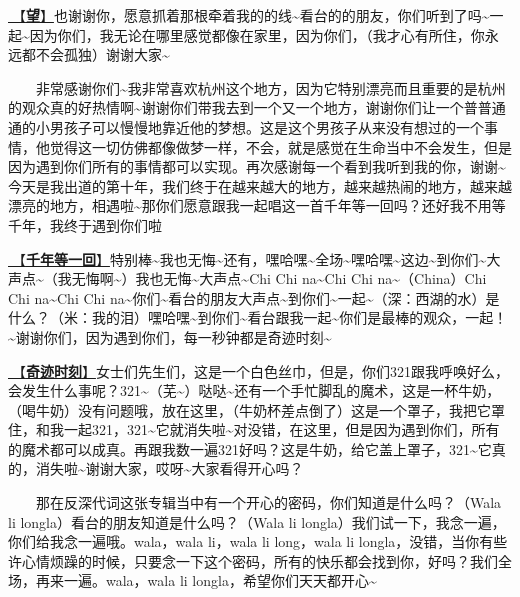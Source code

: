 \documentclass[]{ctexbook}
\begin{document}
\hyperref[Gaze]{🎵【\textbf{望}】}也谢谢你，愿意抓着那根牵着我的的线\textasciitilde 看台的的朋友，你们听到了吗\textasciitilde 一起\textasciitilde 因为你们，我无论在哪里感觉都像在家里，因为你们，（我才心有所住，你永远都不会孤独）谢谢大家\textasciitilde{}

  非常感谢你们\textasciitilde 我非常喜欢杭州这个地方，因为它特别漂亮而且重要的是杭州的观众真的好热情啊\textasciitilde 谢谢你们带我去到一个又一个地方，谢谢你们让一个普普通通的小男孩子可以慢慢地靠近他的梦想。这是这个男孩子从来没有想过的一个事情，他觉得这一切仿佛都像做梦一样，不会，就是感觉在生命当中不会发生，但是因为遇到你们所有的事情都可以实现。再次感谢每一个看到我听到我的你，谢谢\textasciitilde 今天是我出道的第十年，我们终于在越来越大的地方，越来越热闹的地方，越来越漂亮的地方，相遇啦\textasciitilde 那你们愿意跟我一起唱这一首千年等一回吗？还好我不用等千年，我终于遇到你们啦

\hyperref[once-in-1000]{🎵【\textbf{千年等一回}】}特别棒\textasciitilde 我也无悔\textasciitilde 还有，嘿哈嘿\textasciitilde 全场\textasciitilde 嘿哈嘿\textasciitilde 这边\textasciitilde 到你们\textasciitilde 大声点\textasciitilde（我无悔啊\textasciitilde）我也无悔\textasciitilde 大声点\textasciitilde Chi Chi na\textasciitilde Chi Chi na\textasciitilde（China）Chi Chi na\textasciitilde Chi Chi na\textasciitilde 你们\textasciitilde 看台的朋友大声点\textasciitilde 到你们\textasciitilde 一起\textasciitilde（深：西湖的水）是什么？（米：我的泪）嘿哈嘿\textasciitilde 到你们\textasciitilde 看台跟我一起\textasciitilde 你们是最棒的观众，一起！\textasciitilde 谢谢你们，因为遇到你们，每一秒钟都是奇迹时刻\textasciitilde{}

\hyperref[magic-moment]{🎵【\textbf{奇迹时刻}】}女士们先生们，这是一个白色丝巾，但是，你们321跟我呼唤好么，会发生什么事呢？321\textasciitilde（芜\textasciitilde）哒哒\textasciitilde 还有一个手忙脚乱的魔术，这是一杯牛奶，（喝牛奶）没有问题哦，放在这里，（牛奶杯差点倒了）这是一个罩子，我把它罩住，和我一起321，321\textasciitilde 它就消失啦\textasciitilde 对没错，在这里，但是因为遇到你们，所有的魔术都可以成真。再跟我数一遍321好吗？这是牛奶，给它盖上罩子，321\textasciitilde 它真的，消失啦\textasciitilde 谢谢大家，哎呀\textasciitilde 大家看得开心吗？

  那在反深代词这张专辑当中有一个开心的密码，你们知道是什么吗？（Wala li longla）看台的朋友知道是什么吗？（Wala li longla）我们试一下，我念一遍，你们给我念一遍哦。wala，wala li，wala li long，wala li longla，没错，当你有些许心情烦躁的时候，只要念一下这个密码，所有的快乐都会找到你，好吗？我们全场，再来一遍。wala，wala li longla，希望你们天天都开心\textasciitilde{}
\end{document}
